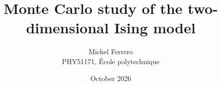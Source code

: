 \documentclass[a4paper,11pt]{article}
\title{Monte Carlo study of the two-dimensional Ising model}
\author{Michel Ferrero\\[2pt]\small PHY51171, \'Ecole polytechnique}
\date{October 2026}
\begin{document}
\maketile
\end{document}
